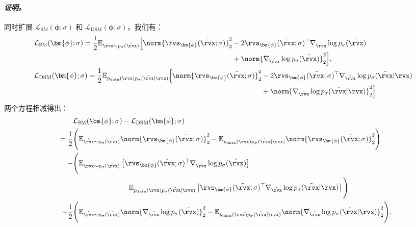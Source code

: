 \paragraph{\textit{证明。}} 同时扩展 $\mathcal{L}_{\text{SM}}(\bm{\phi}; \sigma)$ 和 $\mathcal{L}_{\text{DSM}}(\bm{\phi}; \sigma)$，我们有：
\begin{align*}
 &\mathcal{L}_{\text{SM}}(\bm{\phi}; \sigma) = \frac{1}{2} \mathbb{E}_{\tilde{\rvx} \sim p_\sigma(\tilde{\rvx})}
 \begin{aligned}[t]
         \Big[
    \norm{\rvs_{\bm{\phi}}(\tilde{\rvx}; \sigma)}_2^2
    &- 2 \rvs_{\bm{\phi}}(\tilde{\rvx}; \sigma)^\top  \nabla_{\tilde{\rvx}} \log p_\sigma(\tilde{\rvx}) \\
    &+ \norm{\nabla_{\tilde{\rvx}} \log p_\sigma(\tilde{\rvx})}_2^2
    \Big],
 \end{aligned}
\\
&\mathcal{L}_{\text{DSM}}(\bm{\phi}; \sigma) = \frac{1}{2} \mathbb{E}_{ p_{\text{data}}(\rvx)p_{\sigma}(\tilde{\rvx} | \rvx)}
 \begin{aligned}[t]
         \Big[
    \norm{\rvs_{\bm{\phi}}(\tilde{\rvx}; \sigma)}_2^2
    &- 2 \rvs_{\bm{\phi}}(\tilde{\rvx}; \sigma)^\top \nabla_{\tilde{\rvx}} \log p_{\sigma}(\tilde{\rvx} | \rvx) \\
    &+ \norm{\nabla_{\tilde{\rvx}} \log p_{\sigma}(\tilde{\rvx} | \rvx)}_2^2
    \Big].
 \end{aligned}
\end{align*}
两个方程相减得出：
\begin{align*}
 &\mathcal{L}_{\text{SM}}(\bm{\phi}; \sigma) -\mathcal{L}_{\text{DSM}}(\bm{\phi}; \sigma)
 \\= \frac{1}{2} &\Bigg( \mathbb{E}_{\tilde{\rvx} \sim p_\sigma(\tilde{\rvx})} \norm{\rvs_{\bm{\phi}}(\tilde{\rvx}; \sigma)}_2^2 - \mathbb{E}_{ p_{\text{data}}(\rvx)p_{\sigma}(\tilde{\rvx} | \rvx)} \norm{\rvs_{\bm{\phi}}(\tilde{\rvx}; \sigma)}_2^2\Bigg)
 \\ \quad - &
 \begin{aligned}[t]
 \Bigg(
      \mathbb{E}_{\tilde{\rvx} \sim p_\sigma(\tilde{\rvx})}  &\left[ \rvs_{\bm{\phi}}(\tilde{\rvx}; \sigma)^\top  \nabla_{\tilde{\rvx}} \log p_\sigma(\tilde{\rvx}) \right] \\
      &- \mathbb{E}_{ p_{\text{data}}(\rvx)p_{\sigma}(\tilde{\rvx} | \rvx)}\left[ \rvs_{\bm{\phi}}(\tilde{\rvx}; \sigma)^\top  \nabla_{\tilde{\rvx}} \log p_\sigma(\tilde{\rvx}| \rvx)\right]
      \Bigg)
 \end{aligned}
 \\ \quad +  \frac{1}{2}&\Bigg(\mathbb{E}_{\tilde{\rvx} \sim p_\sigma(\tilde{\rvx})}  \norm{\nabla_{\tilde{\rvx}} \log p_\sigma(\tilde{\rvx})}_2^2  -  \mathbb{E}_{ p_{\text{data}}(\rvx)p_{\sigma}(\tilde{\rvx} | \rvx)} \norm{\nabla_{\tilde{\rvx}} \log p_{\sigma}(\tilde{\rvx} | \rvx)}_2^2   \Bigg).
\end{align*}
